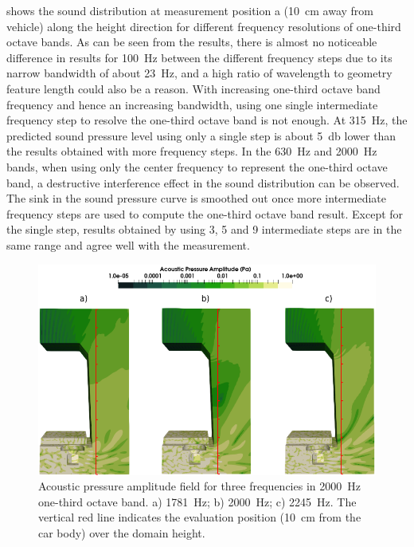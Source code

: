  shows the sound distribution at measurement position a (\SI{10}{\centi\meter} away from vehicle) along the height direction for different frequency resolutions of one-third octave bands. As can be seen from the results, there is almost no noticeable difference in results for \SI{100}{\hertz} between the different frequency steps due to its narrow bandwidth of about \SI{23}{\hertz}, and a high ratio of wavelength to geometry feature length could also be a reason. With increasing one-third octave band frequency and hence an increasing bandwidth, using one single intermediate frequency step to resolve the one-third octave band is not enough. At \SI{315}{\hertz}, the predicted sound pressure level using only a single step is about \SI{5}{\decibel} lower than the results obtained with more frequency steps. In the \SI{630}{\hertz} and \SI{2000}{\hertz} bands, when using only the center frequency to represent the one-third octave band, a destructive interference effect in the sound distribution can be observed. The sink in the sound pressure curve is smoothed out once more intermediate frequency steps are used to compute the one-third octave band result. Except for the single step, results obtained by using 3, 5 and 9 intermediate steps are in the same range and agree well with the measurement.

\begin{figure}
	\centering
	\includegraphics[width=\textwidth]{fig/chap5/freq_steps/field_result.png}
	\caption{Acoustic pressure amplitude field for three frequencies in \SI{2000}{\hertz} one-third octave band. a) \SI{1781}{\hertz}; b) \SI{2000}{\hertz}; c) \SI{2245}{\hertz}. The vertical red line indicates the evaluation position (\SI{10}{\centi\meter} from the car body) over the domain height.}
	\label{fig:pressure_field_solution}
\end{figure}

